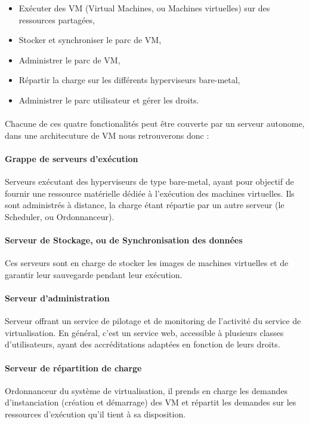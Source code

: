 \begin{itemize}
\item Exécuter des VM (Virtual Machines, ou Machines virtuelles) sur des
ressources partagées,
\item Stocker et synchroniser le parc de VM,
\item Administrer le parc de VM,
\item Répartir la charge sur les différents hyperviseurs bare-metal,
\item Administrer le parc utilisateur et gérer les droits.
\end{itemize} 

\paragraph{} Chacune de ces quatre fonctionalités peut être couverte par un serveur
autonome, dans une architecuture de VM nous retrouverons donc :

\paragraph{Grappe de serveurs d'exécution} Serveurs exécutant des hyperviseurs
de type bare-metal,  ayant pour objectif de fournir une ressource matérielle
dédiée à l'exécution des machines virtuelles. Ils sont administrés à distance,
la charge étant répartie par un autre serveur (le Scheduler, ou Ordonnanceur). 

\paragraph{Serveur de Stockage, ou de Synchronisation des données} Ces serveurs
sont en charge de stocker les images de machines virtuelles et de garantir leur
sauvegarde pendant leur exécution.

\paragraph{Serveur d'administration} Serveur offrant un service de pilotage et
de monitoring de l'activité du service de virtualisation. En général, c'est un
service web, accessible à plusieurs classes d'utilisateurs, ayant des
accréditations adaptées en fonction de leurs droits.


\paragraph{Serveur de répartition de charge} Ordonnanceur du système de
virtualisation, il prends en charge les demandes d'instanciation (création et
démarrage) des VM et répartit les demandes sur les ressources d'exécution qu'il
tient à sa disposition.


